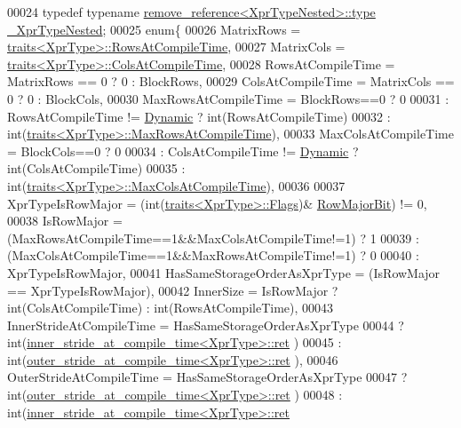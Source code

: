 \begin{DoxyCode}
00024   \textcolor{keyword}{typedef} \textcolor{keyword}{typename} \hyperlink{group___sparse_core___module}{remove\_reference<XprTypeNested>::type} 
      \hyperlink{group___sparse_core___module}{\_XprTypeNested};
00025   \textcolor{keyword}{enum}\{
00026     MatrixRows = \hyperlink{struct_eigen_1_1internal_1_1traits}{traits<XprType>::RowsAtCompileTime},
00027     MatrixCols = \hyperlink{struct_eigen_1_1internal_1_1traits}{traits<XprType>::ColsAtCompileTime},
00028     RowsAtCompileTime = MatrixRows == 0 ? 0 : BlockRows,
00029     ColsAtCompileTime = MatrixCols == 0 ? 0 : BlockCols,
00030     MaxRowsAtCompileTime = BlockRows==0 ? 0
00031                          : RowsAtCompileTime != \hyperlink{namespace_eigen_ad81fa7195215a0ce30017dfac309f0b2}{Dynamic} ? int(RowsAtCompileTime)
00032                          : int(\hyperlink{struct_eigen_1_1internal_1_1traits}{traits<XprType>::MaxRowsAtCompileTime}),
00033     MaxColsAtCompileTime = BlockCols==0 ? 0
00034                          : ColsAtCompileTime != \hyperlink{namespace_eigen_ad81fa7195215a0ce30017dfac309f0b2}{Dynamic} ? int(ColsAtCompileTime)
00035                          : int(\hyperlink{struct_eigen_1_1internal_1_1traits}{traits<XprType>::MaxColsAtCompileTime}),
00036 
00037     XprTypeIsRowMajor = (int(\hyperlink{struct_eigen_1_1internal_1_1traits}{traits<XprType>::Flags})&
      \hyperlink{group__flags_gae4f56c2a60bbe4bd2e44c5b19cbe8762}{RowMajorBit}) != 0,
00038     IsRowMajor = (MaxRowsAtCompileTime==1&&MaxColsAtCompileTime!=1) ? 1
00039                : (MaxColsAtCompileTime==1&&MaxRowsAtCompileTime!=1) ? 0
00040                : XprTypeIsRowMajor,
00041     HasSameStorageOrderAsXprType = (IsRowMajor == XprTypeIsRowMajor),
00042     InnerSize = IsRowMajor ? int(ColsAtCompileTime) : int(RowsAtCompileTime),
00043     InnerStrideAtCompileTime = HasSameStorageOrderAsXprType
00044                              ? int(\hyperlink{struct_eigen_1_1internal_1_1inner__stride__at__compile__time}{inner\_stride\_at\_compile\_time<XprType>::ret}
      )
00045                              : int(\hyperlink{struct_eigen_1_1internal_1_1outer__stride__at__compile__time}{outer\_stride\_at\_compile\_time<XprType>::ret}
      ),
00046     OuterStrideAtCompileTime = HasSameStorageOrderAsXprType
00047                              ? int(\hyperlink{struct_eigen_1_1internal_1_1outer__stride__at__compile__time}{outer\_stride\_at\_compile\_time<XprType>::ret}
      )
00048                              : int(\hyperlink{struct_eigen_1_1internal_1_1inner__stride__at__compile__time}{inner\_stride\_at\_compile\_time<XprType>::ret}

\end{DoxyCode}
